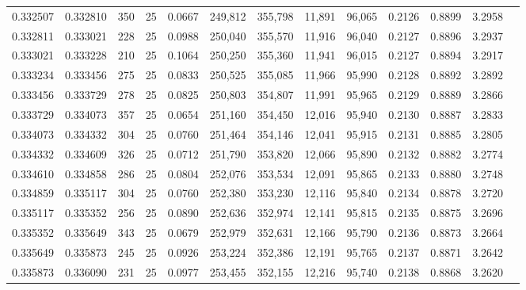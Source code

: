 \begin{tabular}{rrrrrrrrrrrrr}
0.332507 & 0.332810 &   350 &  25 &                                     0.0667 & 249,812 & 355,798 &  11,891 &  96,065 & 0.2126 & 0.8899 & 3.2958 \\
0.332811 & 0.333021 &   228 &  25 &                                     0.0988 & 250,040 & 355,570 &  11,916 &  96,040 & 0.2127 & 0.8896 & 3.2937 \\
0.333021 & 0.333228 &   210 &  25 &                                     0.1064 & 250,250 & 355,360 &  11,941 &  96,015 & 0.2127 & 0.8894 & 3.2917 \\
0.333234 & 0.333456 &   275 &  25 &                                     0.0833 & 250,525 & 355,085 &  11,966 &  95,990 & 0.2128 & 0.8892 & 3.2892 \\
0.333456 & 0.333729 &   278 &  25 &                                     0.0825 & 250,803 & 354,807 &  11,991 &  95,965 & 0.2129 & 0.8889 & 3.2866 \\
0.333729 & 0.334073 &   357 &  25 &                                     0.0654 & 251,160 & 354,450 &  12,016 &  95,940 & 0.2130 & 0.8887 & 3.2833 \\
0.334073 & 0.334332 &   304 &  25 &                                     0.0760 & 251,464 & 354,146 &  12,041 &  95,915 & 0.2131 & 0.8885 & 3.2805 \\
0.334332 & 0.334609 &   326 &  25 &                                     0.0712 & 251,790 & 353,820 &  12,066 &  95,890 & 0.2132 & 0.8882 & 3.2774 \\
0.334610 & 0.334858 &   286 &  25 &                                     0.0804 & 252,076 & 353,534 &  12,091 &  95,865 & 0.2133 & 0.8880 & 3.2748 \\
0.334859 & 0.335117 &   304 &  25 &                                     0.0760 & 252,380 & 353,230 &  12,116 &  95,840 & 0.2134 & 0.8878 & 3.2720 \\
0.335117 & 0.335352 &   256 &  25 &                                     0.0890 & 252,636 & 352,974 &  12,141 &  95,815 & 0.2135 & 0.8875 & 3.2696 \\
0.335352 & 0.335649 &   343 &  25 &                                     0.0679 & 252,979 & 352,631 &  12,166 &  95,790 & 0.2136 & 0.8873 & 3.2664 \\
0.335649 & 0.335873 &   245 &  25 &                                     0.0926 & 253,224 & 352,386 &  12,191 &  95,765 & 0.2137 & 0.8871 & 3.2642 \\
0.335873 & 0.336090 &   231 &  25 &                                     0.0977 & 253,455 & 352,155 &  12,216 &  95,740 & 0.2138 & 0.8868 & 3.2620 \\

\end{tabular}
